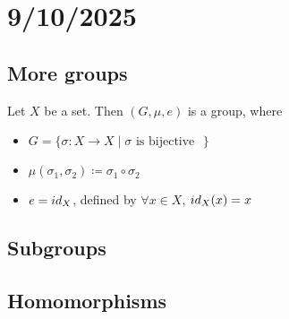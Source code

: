 \section*{9/10/2025}

\subsection*{More groups}

\begin{example}
    Let $X$ be a set. Then $(G,\mu,e)$ is a group, where
    \begin{itemize}
        \item $G = \{ \text{$\sigma:X\to X \mid \text{$\sigma$ is bijective}$ } \}$ %
        \item $\mu(\sigma_1,\sigma_2) \coloneq \sigma_1\circ\sigma_2$
        \item $e = id_X$, defined by $\forall x\in X$, $id_X(x) = x$
    \end{itemize}
\end{example}


\subsection*{Subgroups}



\subsection*{Homomorphisms}



